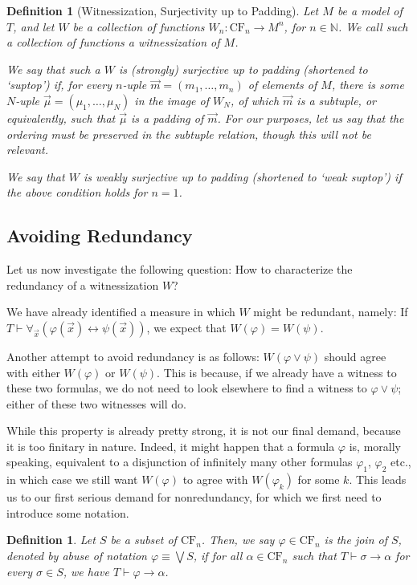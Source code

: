 \documentclass{article}
\newtheorem{definition}[theorem]{Definition}
\theoremstyle{nonumberplain}
\newcommand{\N}{\mathbb{N}}
\newcommand{\CF}{\mathrm{CF}}
\begin{document}
\begin{definition}[Witnessization, Surjectivity up to Padding]
Let $M$ be a model of $T$, and let $W$ be a collection of functions $W_n \colon \CF_n \to M^n$, for $n \in \N$. We call such a collection of functions a \emph{witnessization of $M$}.

We say that such a $W$ is \emph{(strongly) surjective up to padding} (shortened to `suptop') if, for every $n$-uple $\vec m = (m_1, \dots, m_n)$ of elements of $M$, there is some $N$-uple $\vec\mu = (\mu_1, \dots, \mu_N)$ in the image of $W_N$, of which $\vec m$ is a subtuple, or equivalently, such that $\vec\mu$ is a padding of $\vec m$. For our purposes, let us say that the ordering must be preserved in the subtuple relation, though this will not be relevant.

We say that $W$ is \emph{weakly surjective up to padding} (shortened to `weak suptop') if the above condition holds for $n = 1$.
\end{definition}

\subsection{Avoiding Redundancy}

Let us now investigate the following question: How to characterize the redundancy of a witnessization $W$?

We have already identified a measure in which $W$ might be redundant, namely: If $T \vdash \forall_{\vec x}  (\varphi(\vec x) \leftrightarrow \psi(\vec x))$, we expect that $W(\varphi) = W(\psi)$.

Another attempt to avoid redundancy is as follows: $W(\varphi \lor \psi)$ should agree with either $W(\varphi)$ or $W(\psi)$. This is because, if we already have a witness to these two formulas, we do not need to look elsewhere to find a witness to $\varphi \lor \psi$; either of these two witnesses will do.

While this property is already pretty strong, it is not our final demand, because it is too finitary in nature. Indeed, it might happen that a formula $\varphi$ is, morally speaking, equivalent to a disjunction of infinitely many other formulas $\varphi_1$, $\varphi_2$ etc., in which case we still want $W(\varphi)$ to agree with $W(\varphi_k)$ for some $k$. This leads us to our first serious demand for nonredundancy, for which we first need to introduce some notation.
\begin{definition}
Let $S$ be a subset of $\CF_n$. Then, we say $\varphi \in \CF_n$ is the join of $S$, denoted by abuse of notation $\varphi \equiv \bigvee S$, if for all $\alpha \in \CF_n$ such that $T \vdash \sigma \rightarrow \alpha$ for every $\sigma \in S$, we have $T \vdash \varphi \rightarrow \alpha$.
\end{definition}
\end{document}
